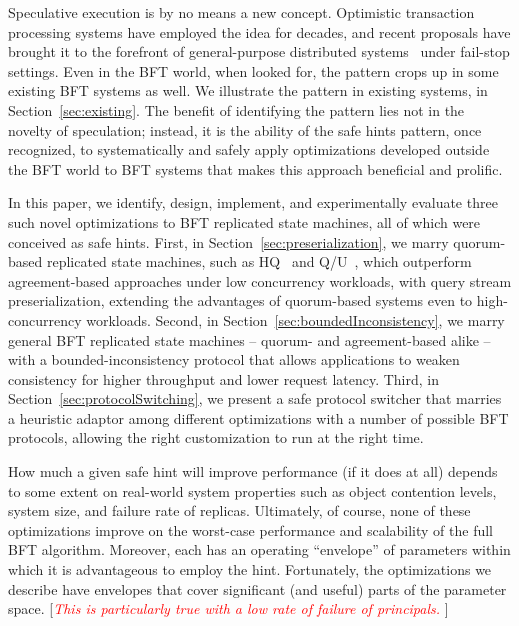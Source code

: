 \documentclass[twocolumn,10pt]{article}
\newcommand{\note}[1]{[\textcolor{red}{\textit{#1}}]}
\begin{document}
Speculative execution is by no means a new concept.  Optimistic
transaction processing systems have employed the idea for decades, and
recent proposals have brought it to the forefront of general-purpose
distributed systems~\cite{Speculator-sosp-05} under fail-stop settings.
Even in the BFT world, when looked for, the pattern crops up in some
existing BFT systems as well.  We illustrate the pattern in existing
systems, in Section~\ref{sec:existing}. The benefit of identifying the
pattern lies not in the novelty of speculation; instead, it is the
ability of the safe hints pattern, once recognized, to systematically
and safely apply optimizations developed outside the BFT world to BFT
systems that makes this approach beneficial and prolific.

In this paper, we identify, design, implement, and experimentally
evaluate three such novel optimizations to BFT
replicated state machines, all of which were conceived as safe hints.  First, in
Section~\ref{sec:preserialization}, we marry quorum-based replicated state machines,
such as HQ~\cite{hq-replication-osdi-06} and
Q/U~\cite{fault-scalable-sosp-05}, which outperform agreement-based
approaches under low concurrency workloads, with query stream
preserialization, extending the advantages of quorum-based systems even
to high-concurrency workloads.  Second, in Section~\ref{sec:boundedInconsistency}, we
marry general BFT replicated state machines -- quorum- and
agreement-based alike -- with a bounded-inconsistency protocol that
allows applications to weaken consistency for higher throughput and
lower request latency.  Third, in Section~\ref{sec:protocolSwitching}, we present
a safe protocol switcher that marries a heuristic adaptor among different
optimizations with a number of possible BFT protocols, allowing the
right customization to run at the right time.

How much a given safe hint will improve performance (if it does at
all) depends to some extent on real-world system properties such as
object contention levels, system size, and failure rate of replicas.
Ultimately, of course, none of these optimizations improve on the
worst-case performance and scalability of the full BFT algorithm.
Moreover, each has an operating ``envelope'' of parameters within
which it is advantageous to employ the hint.  Fortunately, the
optimizations we describe have envelopes that cover significant (and
useful) parts of the parameter space.  \note{This is particularly true with
a low rate of failure of principals. }
\end{document}
